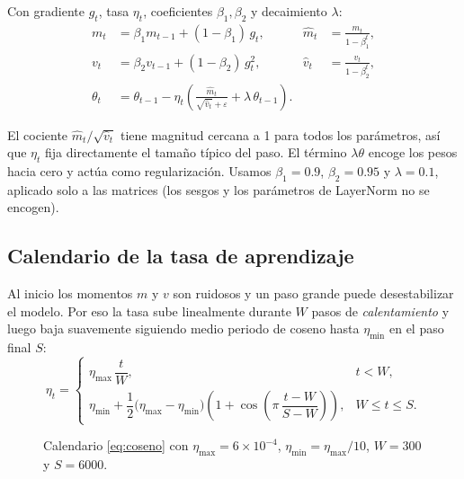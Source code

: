 \documentclass[11pt,letterpaper,oneside]{report}
\begin{document}
\begin{definicion}[AdamW]
Con gradiente $g_t$, tasa $\eta_t$, coeficientes $\beta_1, \beta_2$ y decaimiento $\lambda$:
\begin{align*}
  m_t &= \beta_1 m_{t-1} + (1-\beta_1)\, g_t, & \hat m_t &= \frac{m_t}{1-\beta_1^t},\\
  v_t &= \beta_2 v_{t-1} + (1-\beta_2)\, g_t^2, & \hat v_t &= \frac{v_t}{1-\beta_2^t},\\
  \theta_t &= \theta_{t-1} - \eta_t\left(\frac{\hat m_t}{\sqrt{\hat v_t} + \varepsilon} + \lambda\,\theta_{t-1}\right).
\end{align*}
\end{definicion}

El cociente $\hat m_t/\sqrt{\hat v_t}$ tiene magnitud cercana a 1 para todos los parámetros, así que $\eta_t$ fija directamente el tamaño típico del paso. El término $\lambda\theta$ encoge los pesos hacia cero y actúa como regularización. Usamos $\beta_1 = 0.9$, $\beta_2 = 0.95$ y $\lambda = 0.1$, aplicado solo a las matrices (los sesgos y los parámetros de LayerNorm no se encogen).

\subsection{Calendario de la tasa de aprendizaje}

Al inicio los momentos $m$ y $v$ son ruidosos y un paso grande puede desestabilizar el modelo. Por eso la tasa sube linealmente durante $W$ pasos de \emph{calentamiento} y luego baja suavemente siguiendo medio periodo de coseno hasta $\eta_{\mathrm{min}}$ en el paso final $S$:
\begin{equation}\label{eq:coseno}
  \eta_t = \begin{cases}
    \eta_{\mathrm{max}}\,\dfrac{t}{W}, & t < W,\\[2mm]
    \eta_{\mathrm{min}} + \dfrac12\big(\eta_{\mathrm{max}}-\eta_{\mathrm{min}}\big)\left(1 + \cos\!\left(\pi\,\dfrac{t - W}{S - W}\right)\right), & W \le t \le S.
  \end{cases}
\end{equation}

\begin{figure}[H]
\centering
{}
\caption{Calendario \eqref{eq:coseno} con $\eta_{\mathrm{max}} = 6\times10^{-4}$, $\eta_{\mathrm{min}} = \eta_{\mathrm{max}}/10$, $W = 300$ y $S = 6000$.}
\label{fig:coseno}
\end{figure}
\end{document}
